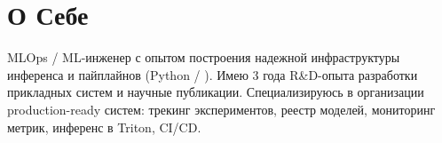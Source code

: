 \documentclass[letterpaper,11pt]{article}
\begin{document}

\section{О Себе}
\begin{itemize}[leftmargin=0.15in, label={}]
	\small{\item{MLOps / ML-инженер с опытом построения надежной инфраструктуры инференса и пайплайнов (Python / \cpp). Имею 3 года R\&D-опыта разработки прикладных систем и научные публикации. Специализируюсь в организации production-ready систем: трекинг экспериментов, реестр моделей, мониторинг метрик, инференс в Triton, CI/CD.}}
\end{itemize}

\def\currentRole{ML-инженер}


\def\currentProjects{%
  \projectBotDetector
  \projectChangeDetector
  \projectAccValidation
}





\end{document}
